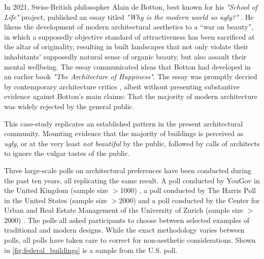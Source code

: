 \documentclass{article}
\begin{document}
\begin{multicols}{2}
    
In 2021, Swiss-British philosopher Alain de Botton, best known for his \textit{"School of Life"} project, published an essay titled \textit{"Why is the modern world so ugly?"} \cite{howarth_why_2021}. He likens the development of modern architectural aesthetics to a “war on beauty”, in which a supposedly objective standard of attractiveness has been sacrificed at the altar of originality, resulting in built landscapes that not only violate their inhabitants’ supposedly natural sense of organic beauty, but also assault their mental wellbeing. The essay communicated ideas that Botton had developed in an earlier book \textit{"The Architecture of Happiness"}. The essay was promptly decried by contemporary architecture critics \cite{rogan_trads_2021}, albeit without presenting substantive evidence against Botton's main claims: That the majority of modern architecture was widely rejected by the general public. 

This case-study replicates an established pattern in the present architectural community. Mounting evidence that the majority of buildings is perceived as \textit{ugly}, or at the very least \textit{not beautiful} by the public, followed by calls of architects to ignore the vulgar tastes of the public. 

Three large-scale polls on architectural preferences have been conducted during the past ten years, all replicating the same result. A poll conducted by YouGov in the United Kingdom (sample size $>$1000) \cite{noauthor_yougov_2009}, a poll conducted by The Harris Poll in the United States (sample size $>$2000) \cite{noauthor_americans_2020} and a poll conducted by the Center for Urban and Real Estate Management of the University of Zurich (sample size $>$2000) \cite{hollenstein_schone_2022}. The polls all asked participants to choose between selected examples of traditional and modern designs. While the exact methodology varies between polls, all polls have taken care to correct for non-aesthetic considerations. Shown in \cref{fig:federal_buildings} is a sample from the U.S. poll.

\end{multicols}
\end{document}
